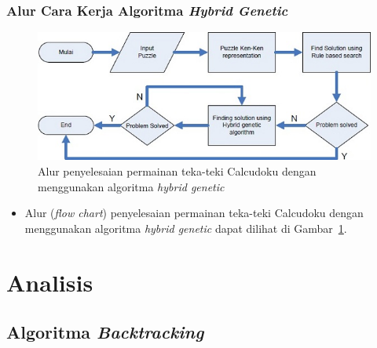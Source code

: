 \documentclass{beamer}
\begin{document}
\begin{frame}
\frametitle{Alur Cara Kerja Algoritma \textit{Hybrid Genetic}}
\begin{figure}
\centering
\captionsetup{justification=centering}
\includegraphics[scale=0.5]{Gambar/HybridGenetic7}
\caption[Alur penyelesaian permainan teka-teki Calcudoku dengan menggunakan algoritma \textit{hybrid genetic} ~\cite{johanna:12:hybrid}]{Alur penyelesaian permainan teka-teki Calcudoku dengan menggunakan algoritma \textit{hybrid genetic}}
\label{fig:hybrid7}
\end{figure}
\begin{itemize}
\item Alur (\textit{flow chart}) penyelesaian permainan teka-teki Calcudoku dengan menggunakan algoritma \textit{hybrid genetic} dapat dilihat di Gambar~\ref{fig:hybrid7}.
\end{itemize}
\end{frame}


\section{Analisis}

\subsection{Algoritma \protect\textit{Backtracking}}
\end{document}
